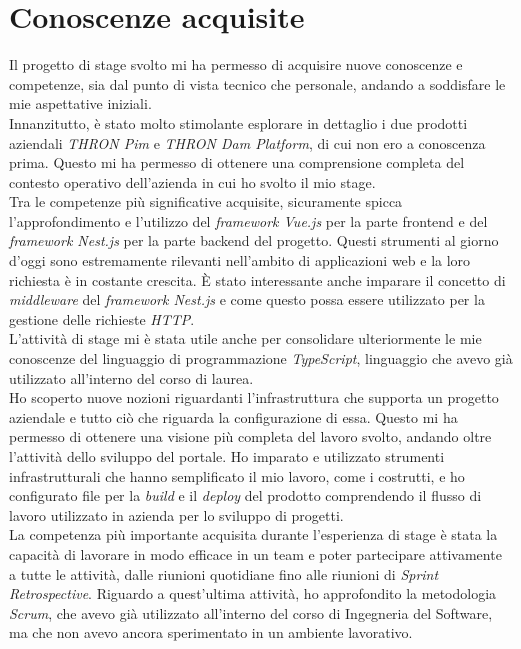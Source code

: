 \section{Conoscenze acquisite}
Il progetto di stage svolto mi ha permesso di acquisire nuove conoscenze e competenze, sia dal punto di vista tecnico che personale, andando a soddisfare le mie aspettative iniziali.\\
Innanzitutto, è stato molto stimolante esplorare in dettaglio i due prodotti aziendali \textit{THRON Pim} e \textit{THRON Dam Platform}, di cui non ero a conoscenza prima. 
Questo mi ha permesso di ottenere una comprensione completa del contesto operativo dell'azienda in cui ho svolto il mio stage.\\
Tra le competenze più significative acquisite, sicuramente spicca l'approfondimento e l'utilizzo del \textit{framework Vue.js} per la parte frontend e del \textit{framework Nest.js} per la parte backend del progetto.
Questi strumenti al giorno d'oggi sono estremamente rilevanti nell'ambito di applicazioni web e la loro richiesta è in costante crescita.
È stato interessante anche imparare il concetto di \textit{middleware} del \textit{framework Nest.js} e come questo possa essere utilizzato per la gestione delle richieste \textit{HTTP}.\\
L'attività di stage mi è stata utile anche per consolidare ulteriormente le mie conoscenze del linguaggio di programmazione \textit{TypeScript}, linguaggio che avevo già utilizzato all'interno del corso di laurea.\\
Ho scoperto nuove nozioni riguardanti l'infrastruttura che supporta un progetto aziendale e tutto ciò che riguarda la configurazione di essa. Questo mi ha permesso di ottenere una visione
più completa del lavoro svolto, andando oltre l'attività dello sviluppo del portale.
Ho imparato e utilizzato strumenti infrastrutturali che hanno semplificato il mio lavoro, come i costrutti, e ho configurato file per la \textit{build} e il \textit{deploy} del prodotto comprendendo il flusso di lavoro utilizzato in azienda per lo sviluppo di progetti.\\
La competenza più importante acquisita durante l'esperienza di stage è stata la capacità di lavorare in modo efficace in un team e poter partecipare attivamente a tutte le attività, dalle riunioni quotidiane fino alle riunioni di \textit{Sprint Retrospective}.
Riguardo a quest'ultima attività, ho approfondito la metodologia \textit{Scrum}, che avevo già utilizzato all'interno del corso di Ingegneria del Software, ma che non avevo ancora sperimentato in un ambiente lavorativo.

